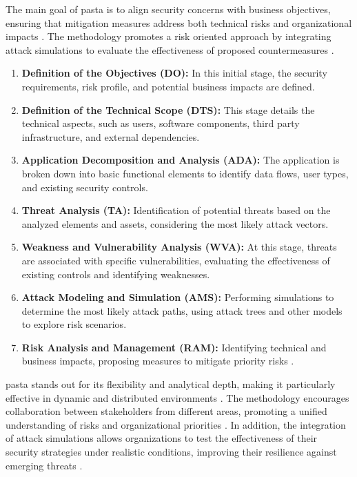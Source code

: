 The main goal of \gls{pasta} is to align security concerns with business
objectives, ensuring that mitigation measures address both technical risks and
organizational impacts \cite{RiskCentricThreatModeling}. The methodology promotes
a risk oriented approach by integrating attack simulations to evaluate the
effectiveness of proposed countermeasures \cite{RiskCentricThreatModeling}.

\begin{enumerate}
    \item \textbf{Definition of the Objectives (DO):} In this initial
stage, the security requirements, risk profile, and potential
business impacts are defined.
    \item \textbf{Definition of the Technical Scope (DTS):} This stage
details the technical aspects, such as users, software components,
third party infrastructure, and external dependencies.
    \item \textbf{Application Decomposition and Analysis (ADA):} The
application is broken down into basic functional elements to identify
data flows, user types, and existing security controls.
    \item \textbf{Threat Analysis (TA):} Identification of potential
threats based on the analyzed elements and assets, considering the most
likely attack vectors.
    \item \textbf{Weakness and Vulnerability Analysis (WVA):} At this
stage, threats are associated with specific vulnerabilities,
evaluating the effectiveness of existing controls and identifying
weaknesses.
    \item \textbf{Attack Modeling and Simulation (AMS):} Performing
simulations to determine the most likely attack paths,
using attack trees and other models to explore risk
scenarios.
    \item \textbf{Risk Analysis and Management (RAM):} Identifying
technical and business impacts, proposing measures to mitigate
priority risks \cite{RiskCentricThreatModeling}.
\end{enumerate}

\gls{pasta} stands out for its flexibility and analytical depth, making it
particularly effective in dynamic and distributed environments
\cite{ThreatModelingASystematicLiteratureReview}. The methodology encourages
collaboration between stakeholders from different areas, promoting a unified
understanding of risks and organizational priorities
\cite{ParticipatoryThreatModelling}. In addition, the integration of attack
simulations allows organizations to test the effectiveness of their security
strategies under realistic conditions, improving their resilience against
emerging threats \cite{RiskCentricThreatModeling}.

